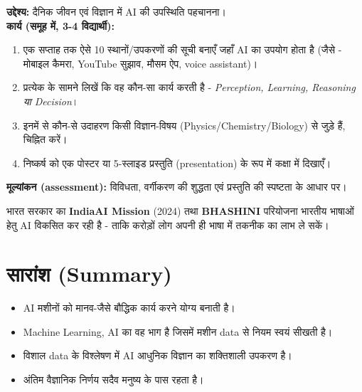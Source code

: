 \begin{pariyojana}[मेरे आस-पास AI]
\textbf{उद्देश्य:} दैनिक जीवन एवं विज्ञान में AI की उपस्थिति पहचानना।\\[4pt]
\textbf{कार्य (समूह में, 3-4 विद्यार्थी):}
\begin{enumerate}[leftmargin=1.6em]
  \item एक सप्ताह तक ऐसे 10 स्थानों/उपकरणों की सूची बनाएँ जहाँ AI का उपयोग होता है
        (जैसे - मोबाइल कैमरा, YouTube सुझाव, मौसम ऐप, voice assistant)।
  \item प्रत्येक के सामने लिखें कि वह कौन-सा कार्य करती है - \emph{Perception,
        Learning, Reasoning या Decision}।
  \item इनमें से कौन-से उदाहरण किसी विज्ञान-विषय (Physics/Chemistry/Biology) से
        जुड़े हैं, चिह्नित करें।
  \item निष्कर्ष को एक पोस्टर या 5-स्लाइड प्रस्तुति (presentation) के रूप में
        कक्षा में दिखाएँ।
\end{enumerate}
\textbf{मूल्यांकन (assessment):} विविधता, वर्गीकरण की शुद्धता एवं प्रस्तुति की
स्पष्टता के आधार पर।
\end{pariyojana}

\begin{bharatai}
भारत सरकार का \textbf{IndiaAI Mission} (2024) तथा \textbf{BHASHINI} परियोजना भारतीय
भाषाओं हेतु AI विकसित कर रही है - ताकि करोड़ों लोग अपनी ही भाषा में तकनीक का लाभ ले सकें।
\end{bharatai}

\section*{सारांश (Summary)}
\begin{itemize}[leftmargin=1.4em]
  \item AI मशीनों को मानव-जैसे बौद्धिक कार्य करने योग्य बनाती है।
  \item Machine Learning, AI का वह भाग है जिसमें मशीन data से नियम स्वयं सीखती है।
  \item विशाल data के विश्लेषण में AI आधुनिक विज्ञान का शक्तिशाली उपकरण है।
  \item अंतिम वैज्ञानिक निर्णय सदैव मनुष्य के पास रहता है।
\end{itemize}

